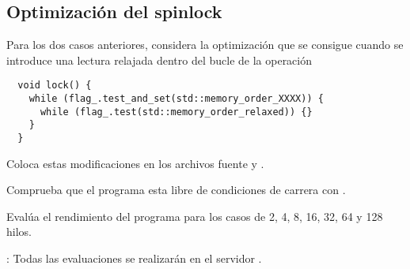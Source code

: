 \subsection{Optimización del spinlock}

Para los dos casos anteriores, considera la optimización que se consigue cuando se introduce
una lectura relajada dentro del bucle de la operación 

\begin{lstlisting}
  void lock() {
    while (flag_.test_and_set(std::memory_order_XXXX)) {
      while (flag_.test(std::memory_order_relaxed)) {}
    }
  }
\end{lstlisting}

Coloca estas modificaciones en los archivos fuente  y 
.

Comprueba que el programa esta libre de condiciones de carrera con .

Evalúa el rendimiento del programa para los casos de 2, 4, 8, 16, 32, 64 y 128 hilos.

: Todas las evaluaciones se realizarán en el servidor .

